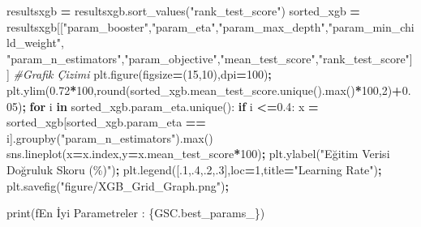 \documentclass[12pt,twoside]{deuthesis}
\newenvironment{Shaded}{\begin{snugshade}}{\end{snugshade}}
\newcommand{\BuiltInTok}[1]{#1}
\newcommand{\CommentTok}[1]{\textcolor[rgb]{0.56,0.35,0.01}{\textit{#1}}}
\newcommand{\ControlFlowTok}[1]{\textcolor[rgb]{0.13,0.29,0.53}{\textbf{#1}}}
\newcommand{\DecValTok}[1]{\textcolor[rgb]{0.00,0.00,0.81}{#1}}
\newcommand{\FloatTok}[1]{\textcolor[rgb]{0.00,0.00,0.81}{#1}}
\newcommand{\KeywordTok}[1]{\textcolor[rgb]{0.13,0.29,0.53}{\textbf{#1}}}
\newcommand{\NormalTok}[1]{#1}
\newcommand{\OperatorTok}[1]{\textcolor[rgb]{0.81,0.36,0.00}{\textbf{#1}}}
\newcommand{\SpecialCharTok}[1]{\textcolor[rgb]{0.00,0.00,0.00}{#1}}
\newcommand{\SpecialStringTok}[1]{\textcolor[rgb]{0.31,0.60,0.02}{#1}}
\newcommand{\StringTok}[1]{\textcolor[rgb]{0.31,0.60,0.02}{#1}}
\begin{document}
\begin{Shaded}
\begin{Highlighting}[]
\NormalTok{resultsxgb }\OperatorTok{=}\NormalTok{ resultsxgb.sort\_values(}\StringTok{"rank\_test\_score"}\NormalTok{)}
\NormalTok{sorted\_xgb }\OperatorTok{=}\NormalTok{ resultsxgb[[}\StringTok{"param\_booster"}\NormalTok{,}\StringTok{"param\_eta"}\NormalTok{,}\StringTok{"param\_max\_depth"}\NormalTok{,}\StringTok{"param\_min\_child\_weight"}\NormalTok{,}
\StringTok{"param\_n\_estimators"}\NormalTok{,}\StringTok{"param\_objective"}\NormalTok{,}\StringTok{"mean\_test\_score"}\NormalTok{,}\StringTok{"rank\_test\_score"}\NormalTok{]]}
\CommentTok{\#Grafik Çizimi}
\NormalTok{plt.figure(figsize}\OperatorTok{=}\NormalTok{(}\DecValTok{15}\NormalTok{,}\DecValTok{10}\NormalTok{),dpi}\OperatorTok{=}\DecValTok{100}\NormalTok{)}\OperatorTok{;}
\NormalTok{plt.ylim(}\FloatTok{0.72}\OperatorTok{*}\DecValTok{100}\NormalTok{,}\BuiltInTok{round}\NormalTok{(sorted\_xgb.mean\_test\_score.unique().}\BuiltInTok{max}\NormalTok{()}\OperatorTok{*}\DecValTok{100}\NormalTok{,}\DecValTok{2}\NormalTok{)}\OperatorTok{+}\FloatTok{0.05}\NormalTok{)}\OperatorTok{;}
\ControlFlowTok{for}\NormalTok{ i }\KeywordTok{in}\NormalTok{ sorted\_xgb.param\_eta.unique():}
    \ControlFlowTok{if}\NormalTok{ i }\OperatorTok{\textless{}=}\FloatTok{0.4}\NormalTok{:}
\NormalTok{        x }\OperatorTok{=}\NormalTok{ sorted\_xgb[sorted\_xgb.param\_eta }\OperatorTok{==}\NormalTok{ i].groupby(}\StringTok{"param\_n\_estimators"}\NormalTok{).}\BuiltInTok{max}\NormalTok{()}
\NormalTok{        sns.lineplot(x}\OperatorTok{=}\NormalTok{x.index,y}\OperatorTok{=}\NormalTok{x.mean\_test\_score}\OperatorTok{*}\DecValTok{100}\NormalTok{)}\OperatorTok{;}
\NormalTok{plt.ylabel(}\StringTok{"Eğitim Verisi Doğruluk Skoru (\%)"}\NormalTok{)}\OperatorTok{;}
\NormalTok{plt.legend([}\FloatTok{.1}\NormalTok{,}\FloatTok{.4}\NormalTok{,}\FloatTok{.2}\NormalTok{,}\FloatTok{.3}\NormalTok{],loc}\OperatorTok{=}\DecValTok{1}\NormalTok{,title}\OperatorTok{=}\StringTok{"Learning Rate"}\NormalTok{)}\OperatorTok{;}
\NormalTok{plt.savefig(}\StringTok{"figure/XGB\_Grid\_Graph.png"}\NormalTok{)}\OperatorTok{;}
\end{Highlighting}
\end{Shaded}
\begin{Shaded}
\begin{Highlighting}[]
\BuiltInTok{print}\NormalTok{(}\SpecialStringTok{f\textquotesingle{}En İyi Parametreler : }\SpecialCharTok{\{}\NormalTok{GSC}\SpecialCharTok{.}\NormalTok{best\_params\_}\SpecialCharTok{\}}\SpecialStringTok{\textquotesingle{}}\NormalTok{)}
\end{Highlighting}
\end{Shaded}
\end{document}
